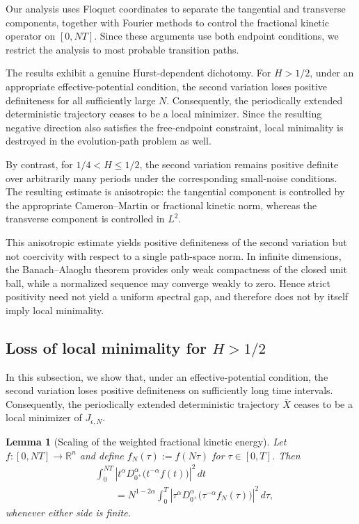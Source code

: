 \documentclass[preprint,12pt]{elsarticle}
\newtheorem{lemma}[theorem]{Lemma}
\theoremstyle{definition}
\theoremstyle{plain}
\begin{document}
Our analysis uses Floquet coordinates to separate the tangential and
transverse components, together with Fourier methods to control the
fractional kinetic operator on $[0,NT]$. Since these arguments use both
endpoint conditions, we restrict the analysis to most probable
transition paths.

The results exhibit a genuine Hurst-dependent dichotomy. For
$H>1/2$, under an appropriate effective-potential condition, the
second variation loses positive definiteness for all sufficiently
large $N$. Consequently, the periodically extended deterministic
trajectory ceases to be a local minimizer. Since the resulting
negative direction also satisfies the free-endpoint constraint, local
minimality is destroyed in the evolution-path problem as well.

By contrast, for $1/4<H\leq1/2$, the second variation remains positive
definite over arbitrarily many periods under the corresponding
small-noise conditions. The resulting estimate is anisotropic: the
tangential component is controlled by the appropriate
Cameron--Martin or fractional kinetic norm, whereas the transverse
component is controlled in $L^2$.

This anisotropic estimate yields positive definiteness of the second
variation but not coercivity with respect to a single path-space norm.
In infinite dimensions, the Banach--Alaoglu theorem provides only weak
compactness of the closed unit ball, while a normalized sequence may
converge weakly to zero. Hence strict positivity need not yield a
uniform spectral gap, and therefore does not by itself imply local
minimality.



\subsection{Loss of local minimality for $H>1/2$}

In this subsection, we show that, under an effective-potential
condition, the second variation loses positive definiteness on
sufficiently long time intervals. Consequently, the periodically
extended deterministic trajectory $\bar X$ ceases to be a local
minimizer of $J_{\epsilon,N}$.



\begin{lemma}[Scaling of the weighted fractional kinetic energy]
\label{lem:scaling-weighted-fractional-derivative}
Let $f:[0,NT]\to\mathbb R^n$ and define
$f_N(\tau):=f(N\tau)$ for $\tau\in[0,T]$. Then
\begin{equation}
\label{eq:scaling-weighted-fractional-derivative}
\begin{aligned}
&\int_0^{NT}
\left|
    t^\alpha D_{0^+}^\alpha
    \bigl(t^{-\alpha}f(t)\bigr)
\right|^2\,dt
\\
&\qquad=
N^{1-2\alpha}
\int_0^T
\left|
    \tau^\alpha D_{0^+}^\alpha
    \bigl(\tau^{-\alpha}f_N(\tau)\bigr)
\right|^2\,d\tau,
\end{aligned}
\end{equation}
whenever either side is finite.
\end{lemma}
\end{document}
